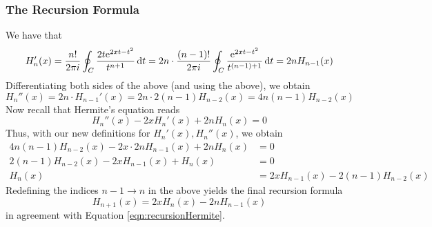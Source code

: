 \documentclass[titlepage]{article}
\numberwithin{equation}{section}
\begin{document}
\subsubsection{The Recursion Formula}
We have that
\begin{equation*}
    H_n'(x) = \frac{n!}{2\pi i}\oint_C\frac{2t\e[2xt-t^2]}{t^{n+1}}\dd{t}
    = 2n\cdot \frac{(n-1)!}{2\pi i}\oint_C\frac{\e[2xt-t^2]}{t^{(n-1)+1}}\dd{t}
    = 2nH_{n-1}(x)
\end{equation*}
Differentiating both sides of the above (and using the above), we obtain
\begin{equation*}
    H_n''(x) = 2n\cdot H_{n-1}'(x)
    = 2n\cdot 2(n-1)H_{n-2}(x)
    = 4n(n-1)H_{n-2}(x)
\end{equation*}
Now recall that Hermite's equation reads
\begin{equation*}
    H_n''(x)-2xH_n'(x)+2nH_n(x) = 0
\end{equation*}
Thus, with our new definitions for $H_n'(x),H_n''(x)$, we obtain
\begin{align*}
    4n(n-1)H_{n-2}(x)-2x\cdot 2nH_{n-1}(x)+2nH_n(x) &= 0\\
    2(n-1)H_{n-2}(x)-2xH_{n-1}(x)+H_n(x) &= 0\\
    H_n(x) &= 2xH_{n-1}(x)-2(n-1)H_{n-2}(x)
\end{align*}
Redefining the indices $n-1\to n$ in the above yields the final recursion formula
\begin{equation*}
    H_{n+1}(x) = 2xH_n(x)-2nH_{n-1}(x)
\end{equation*}
in agreement with Equation \ref{eqn:recursionHermite}.
\newpage
\end{document}
